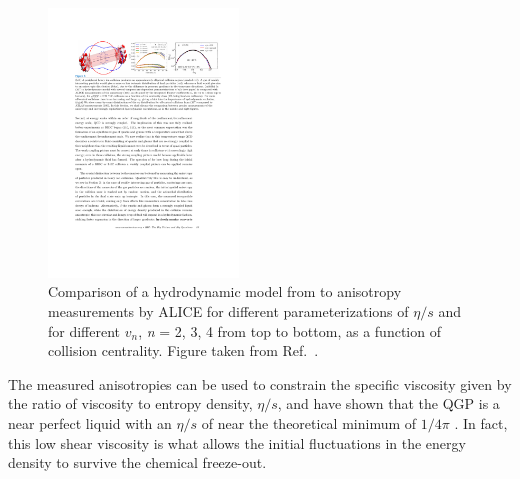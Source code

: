 \begin{figure}[htbp]
\begin{center}
\includegraphics[width=0.45\textwidth]{figures/theory/flow_coefficients}
\caption{Comparison of a hydrodynamic model from \cite{Niemi:2015qia} to anisotropy measurements by ALICE \cite{ALICE:2011ab} for different parameterizations of $\eta / s $ and for different $v_n$, {\it{n}} = 2, 3, 4 from top to bottom, as a function of collision centrality.
Figure taken from Ref.~\cite{Busza:2018rrf}.}
\label{fig:flow_coeff}
\end{center}
\end{figure}

The measured anisotropies can be used to constrain the specific viscosity given by the ratio of viscosity to entropy density, $\eta / s$, and have shown that the QGP is a near perfect liquid with an $\eta / s$ of near the theoretical minimum of $1/4\pi$ \cite{ARSENE20051, GYULASSY200530}.
In fact, this low shear viscosity is what allows the initial fluctuations in the energy density to survive the chemical freeze-out.

























